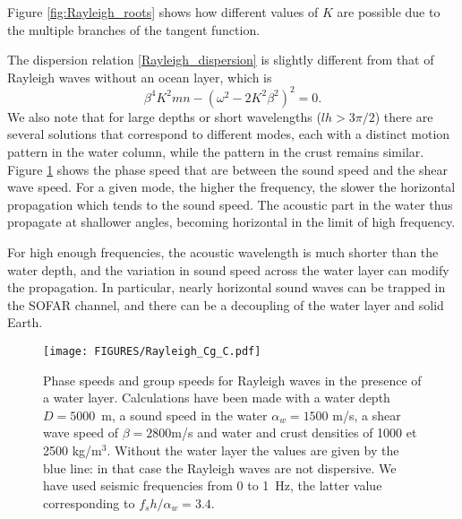 Figure \ref{fig:Rayleigh_roots} shows how different values of  $K$ are possible due to the multiple branches of the tangent function. 


The dispersion relation  \ref{Rayleigh_dispersion} is slightly different from that of Rayleigh waves without an ocean layer, 
which is 
\begin{equation}
\beta^4 K^2 m n  - \left (\omega^2- 2  K^2 \beta^2 \right)^2  =0.
\end{equation}
We also note that for large depths or short wavelengths  ($lh > 3 \pi / 2$) there are several solutions that 
correspond to different modes, each with a distinct motion pattern in the water column, while the pattern in the crust remains similar. 
Figure \ref{fig:Rayleigh_dispersion} shows the phase speed that are between the sound speed and the shear wave speed. 
For a given mode, the higher the frequency, the slower the horizontal propagation which tends to the sound speed. The acoustic part in the 
water thus propagate at shallower angles, becoming horizontal in the limit of high frequency. 

For high enough frequencies, the acoustic wavelength is much shorter than the water depth, and the variation 
in sound speed across the water layer can modify the propagation. In particular, nearly horizontal sound waves can 
be trapped in the SOFAR channel, and there can be a decoupling of the water layer and solid Earth. 
\begin{figure}[ht]
\centerline{\texttt{[image: FIGURES/Rayleigh\_Cg\_C.pdf]}}
  \caption{Phase speeds and group speeds for Rayleigh waves in the presence 
  of a water layer. Calculations have been made with a water depth $D=5000$~m, a sound speed in the water $\alpha_w=1500$ m/s, a shear wave speed of  
$\beta=2800$m/s and water and crust densities of  1000 et 2500 kg/m$^3$.  Without the water layer the values are given by the blue line: 
in that case the Rayleigh waves are not dispersive. We have used seismic frequencies from 0 to 1~Hz, the latter value corresponding to $f_s h/\alpha_w=3.4$.  }
\label{fig:Rayleigh_dispersion}
\end{figure}

